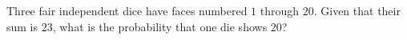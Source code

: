 Three fair independent dice have faces numbered $1$ through $20$. Given that their sum is $23$, what is the probability that one die shows $20$?
